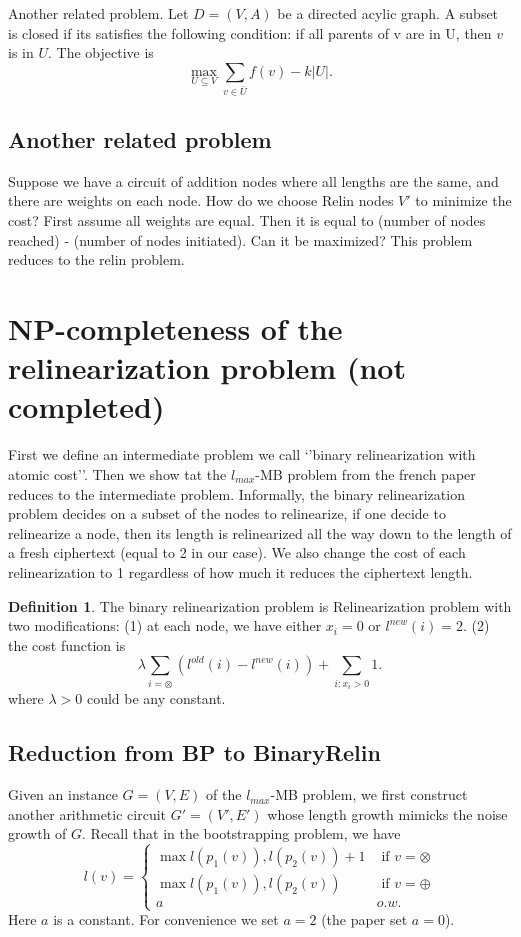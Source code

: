\documentclass[11pt]{article} %
\theoremstyle{plain}
\theoremstyle{definition}
\newtheorem{definition}{Definition}
\begin{document}
Another related problem. Let $D = (V,A)$ be a directed acylic graph. A subset 
is closed if its satisfies the following condition: if all parents of v are in U, then $v$ is in $U$. The objective is 
\[
	\max_{U \subseteq V} \sum_{v \in \bar{U}} f(v)  - k |U|. 
\]


\subsection{Another related problem}

Suppose we have a circuit of addition nodes where all lengths are the same, and there are weights 
on each node. How do we choose Relin nodes $V'$ to minimize the cost? First assume all weights are 
equal. Then it is equal to (number of nodes reached) - (number of nodes initiated). Can it be maximized? 
This problem reduces to the relin problem. 



\section{NP-completeness of the relinearization problem (not completed)}

First we define an intermediate problem we call `'binary relinearization with atomic cost''. Then we show tat the $l_{max}$-MB problem from the french 
paper reduces to the intermediate problem. Informally, the binary relinearization problem decides on a subset of the nodes to relinearize, if one decide to relinearize a node, then its length is relinearized all the way down to the length of a fresh ciphertext (equal to 2 in our case). We also change the cost of each relinearization to 1 regardless of how much it reduces the ciphertext length. 

\begin{definition}
The binary relinearization problem is Relinearization problem with two modifications: (1) at each node, we have either $x_i = 0$ or $l^{new}(i) = 2$. (2) the cost function is 
\[
	\lambda \sum_{i = \otimes } (l^{old}(i) - l^{new}(i)) + \sum_{i: x_i > 0} 1.  
\]	
where $\lambda > 0$ could be any constant. 
\end{definition}

\subsection{Reduction from BP to BinaryRelin}

Given an instance $G = (V,E)$ of the $l_{max}$-MB problem, we first construct another arithmetic circuit $G' = (V',E')$ whose length growth mimicks the noise growth of $G$. Recall that in the bootstrapping problem, 
we have 
\[
	l(v) = \begin{cases} \max{l(p_1(v)), l(p_2(v))} + 1 & \mbox{ if } v = \otimes \\ 
	\max{l(p_1(v)), l(p_2(v))} & \mbox{ if } v = \oplus \\ 
	a & o.w. 
	\end{cases}
\]
Here $a$ is a constant. For convenience we set $a = 2$ (the paper set $a = 0$). 
\end{document}
